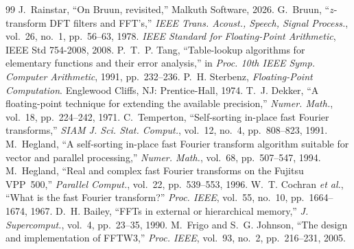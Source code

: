 \documentclass[conference]{IEEEtran}
\begin{document}
\begin{thebibliography}{99}
 J.~Rainstar, ``On Bruun, revisited,'' Malkuth Software, 2026.
 G.~Bruun, ``$z$-transform DFT filters and FFT's,'' \emph{IEEE Trans. Acoust., Speech, Signal Process.}, vol.~26, no.~1, pp.~56--63, 1978.
 \emph{IEEE Standard for Floating-Point Arithmetic}, IEEE Std 754-2008, 2008.
 P.~T.~P. Tang, ``Table-lookup algorithms for elementary functions and their error analysis,'' in \emph{Proc. 10th IEEE Symp. Computer Arithmetic}, 1991, pp.~232--236.
 P.~H. Sterbenz, \emph{Floating-Point Computation}. Englewood Cliffs, NJ: Prentice-Hall, 1974.
 T.~J. Dekker, ``A floating-point technique for extending the available precision,'' \emph{Numer. Math.}, vol.~18, pp.~224--242, 1971.
 C.~Temperton, ``Self-sorting in-place fast Fourier transforms,'' \emph{SIAM J. Sci. Stat. Comput.}, vol.~12, no.~4, pp.~808--823, 1991.
 M.~Hegland, ``A self-sorting in-place fast Fourier transform algorithm suitable for vector and parallel processing,'' \emph{Numer. Math.}, vol.~68, pp.~507--547, 1994.
 M.~Hegland, ``Real and complex fast Fourier transforms on the Fujitsu VPP~500,'' \emph{Parallel Comput.}, vol.~22, pp.~539--553, 1996.
 W.~T. Cochran \emph{et al.}, ``What is the fast Fourier transform?'' \emph{Proc. IEEE}, vol.~55, no.~10, pp.~1664--1674, 1967.
 D.~H. Bailey, ``FFTs in external or hierarchical memory,'' \emph{J. Supercomput.}, vol.~4, pp.~23--35, 1990.
 M.~Frigo and S.~G. Johnson, ``The design and implementation of FFTW3,'' \emph{Proc. IEEE}, vol.~93, no.~2, pp.~216--231, 2005.
\end{thebibliography}
\end{document}
